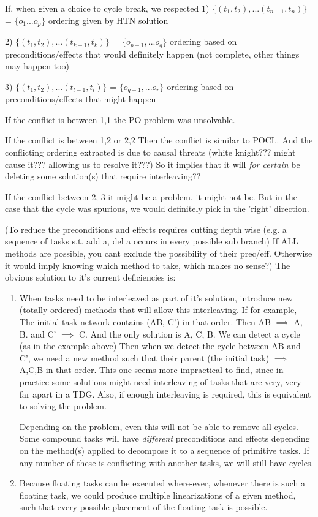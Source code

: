 If, when given a choice to cycle break, we respected 
1) $\{(t_1, t_2), ... (t_{n-1}, t_n )\}$ = $\{o_1 ... o_p \}$ ordering given by HTN solution

2) $\{(t_1, t_2), ... (t_{k-1}, t_k )\}$ = $\{o_{p+1}, ... o_q\}$ ordering based on preconditions/effects that would definitely happen (not complete, other things may happen too)

3) $\{(t_1, t_2), ... (t_{l-1}, t_l )\}$ = $\{o_{q+1}, ... o_r\}$ ordering based on preconditions/effects that might happen

If the conflict is between 1,1 the PO problem was unsolvable.

If the conflict is between 1,2 or 2,2
Then the conflict is similar to POCL.
And the conflicting  ordering extracted is due to causal threats (white knight??? might cause it??? allowing us to resolve it???)
So it implies that it will \emph{for certain} be deleting some solution(s) that require interleaving??

If the conflict between 2, 3 it might be a problem, it might not be. But in the case that the cycle was spurious, we would definitely pick in the 'right' direction.



(To reduce the preconditions and effects requires cutting depth wise (e.g. a sequence of tasks s.t.  add a, del a occurs in every possible sub branch)
If ALL methods are possible, you cant exclude the possibility of their prec/eff. Otherwise it would imply knowing which method to take, which makes no sense?)
The obvious solution to it's current deficiencies is: 
\begin{enumerate}
	\item When tasks need to be interleaved as part of it's solution, introduce new (totally ordered) methods that will allow this interleaving.
	If for example, The initial task network contains (AB, C') in that order. Then AB $\implies$ A, B.  and C' $\implies$ C.
	And the only solution is A, C, B. We can detect a cycle (as in the example above)
	Then when we detect the cycle between AB and C', we need a new method such that their parent (the initial task) $\implies$ A,C,B  in that order.  This one seems more impractical to find,	since in practice some solutions might need interleaving of tasks that are very, very far apart in a TDG.
	Also, if enough interleaving is required, this is equivalent to solving the problem. 
	
	
	Depending on the problem, even this will not be able to remove all cycles.  Some compound tasks will have \emph{different} 
	preconditions and effects depending	on the method(s) applied to decompose it to a sequence of primitive tasks. If any number of
	these is conflicting with another tasks, we will still have cycles.
	
	\item Because floating tasks can be executed where-ever, whenever there is such a floating task, we could produce
	multiple linearizations of a given method, such that every possible placement of the floating task is possible.
\end{enumerate}
